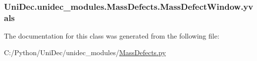 \subsubsection[{yvals}]{\setlength{\rightskip}{0pt plus 5cm}Uni\+Dec.\+unidec\+\_\+modules.\+Mass\+Defects.\+Mass\+Defect\+Window.\+yvals}\label{class_uni_dec_1_1unidec__modules_1_1_mass_defects_1_1_mass_defect_window_a4088447d3b1c7279ef14601e17e2c316}


The documentation for this class was generated from the following file\+:\begin{DoxyCompactItemize}
\item 
C\+:/\+Python/\+Uni\+Dec/unidec\+\_\+modules/\hyperlink{_mass_defects_8py}{Mass\+Defects.\+py}\end{DoxyCompactItemize}
